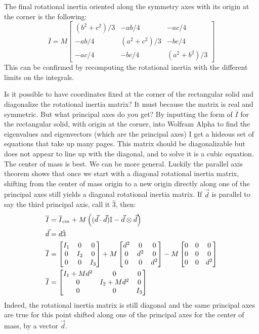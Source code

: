\documentclass[10pt]{article}
\begin{document}
The final rotational inertia oriented along the symmetry axes with its origin 
at the corner is the following:
\[
\overline{I} = M
\begin{bmatrix}
     (b^2+c^2)/3 & -ab/4 & -ac/4 \\
    -ab/4 & (a^2+c^2)/3 & -bc/4 \\
    -ac/4 & -bc/4 & (a^2+b^2)/3
\end{bmatrix}
\]
This can be confirmed by recomputing the rotational inertia with the different 
limits on the integrals. 

Is it possible to have coordinates fixed at the corner of the rectangular 
solid and diagonalize the rotational inertia matrix? It must because 
the matrix is real and symmetric. But what principal axes do you get? By 
inputting the form of $\overline{I}$ for the rectangular solid, with origin at 
the corner, into Wolfram Alpha to find the eigenvalues and eigenvectors (which 
are the principal axes) I get a hideous set of equations that take up many 
pages. This matrix should be diagonalizable but does not appear to line up 
with the diagonal, and to solve it is a cubic equation. The center of mass is
best. We can be more general. 
Luckily the parallel axis theorem shows that once we start with 
a diagonal rotational inertia matrix, shifting from 
the center of mass origin to a new origin directly 
along one of the principal axes still yields a diagonal rotational inertia 
matrix. If $\vec{d}$ is parallel to say the third principal axis, call it 
$\hat{3}$, then:
\begin{align}
    \overline{I} &= \overline{I}_{cm}+M\left((\vec{d}\cdot\vec{d})\mathbb{I}
        -\vec{d}\otimes\vec{d}\right) \notag\\
    \vec{d} &= d\hat{3} \\
    \overline{I} &= 
    \begin{bmatrix}
        I_1 & 0 & 0 \\
        0 & I_2 & 0 \\
        0 & 0 & I_3
    \end{bmatrix}
    +M
    \begin{bmatrix}
        d^2 & 0 & 0 \\
        0 & d^2 & 0 \\
        0 & 0 & d^2
    \end{bmatrix}
    -M
    \begin{bmatrix}
        0 & 0 & 0 \\
        0 & 0 & 0 \\
        0 & 0 & d^2
    \end{bmatrix}
    \notag\\
    \overline{I} &=
    \begin{bmatrix}
        I_1 + Md^2 & 0 & 0 \\
        0 & I_2 + Md^2 & 0 \\
        0 & 0 & I_3
    \end{bmatrix} \label{isymshift}
\end{align}
Indeed, the rotational inertia matrix is still diagonal and the 
same principal axes are true for this point shifted along one of the 
principal axes for the center of mass, by a vector $\vec{d}$.
\end{document}
